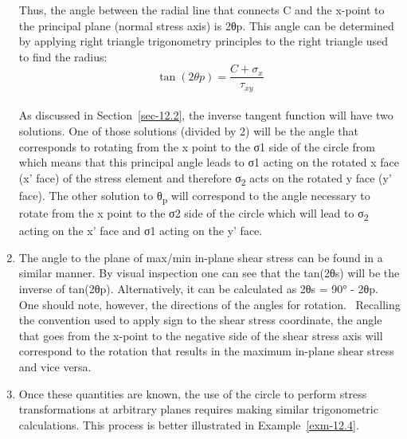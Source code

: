 \documentclass[
  letterpaper,
  DIV=11,
  numbers=noendperiod]{scrreprt}
\theoremstyle{definition}
\theoremstyle{remark}
\begin{document}
\begin{enumerate}
  Thus, the angle between the radial line that connects C and the
  x-point to the principal plane (normal stress axis) is 2θp. This angle
  can be determined by applying right triangle trigonometry principles
  to the right triangle used to find the radius:\\
  \[
  \tan (2 \theta p)=\frac{C+\sigma_x}{\tau_{x y}}
  \]\\
  As discussed in Section~\ref{sec-12.2}, the inverse tangent function
  will have two solutions. One of those solutions (divided by 2) will be
  the angle that corresponds to rotating from the x point to the σ1 side
  of the circle from which means that this principal angle leads to σ1
  acting on the rotated x face (x' face) of the stress element and
  therefore σ\textsubscript{2} acts on the rotated y face (y' face). The
  other solution to θ\textsubscript{p} will correspond to the angle
  necessary to rotate from the x point to the σ2 side of the circle
  which will lead to σ\textsubscript{2} acting on the x' face and σ1
  acting on the y' face.
\item
  The angle to the plane of max/min in-plane shear stress can be found
  in a similar manner. By visual inspection one can see that the
  tan(2θs) will be the inverse of tan(2θp). Alternatively, it can be
  calculated as 2θs = 90° - 2θp. One should note, however, the
  directions of the angles for rotation. ~Recalling the convention used
  to apply sign to the shear stress coordinate, the angle that goes from
  the x-point to the negative side of the shear stress axis will
  correspond to the rotation that results in the maximum in-plane shear
  stress and vice versa.
\item
  Once these quantities are known, the use of the circle to perform
  stress transformations at arbitrary planes requires making similar
  trigonometric calculations. This process is better illustrated in
  Example~\ref{exm-12.4}.
\end{enumerate}
\end{document}
